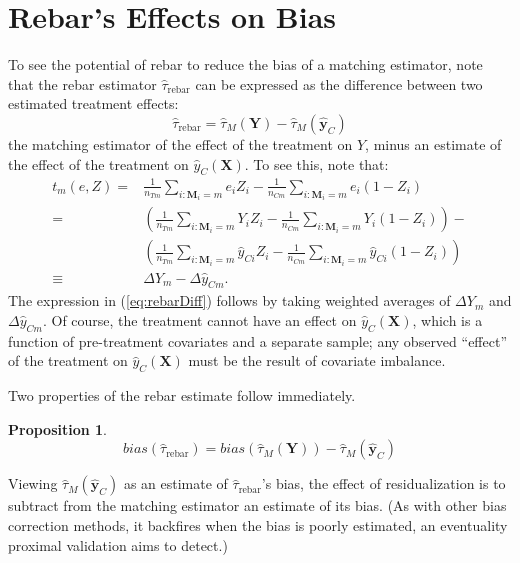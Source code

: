 \documentclass[12pt]{article}\usepackage[]{graphicx}\usepackage[]{color}
\newcommand{\est}{\hat{\tau}_{\text{rebar}}}
\newcommand{\Match}{M}
\newcommand{\match}{m}
\newcommand{\covMat}{\bm{X}}
\newtheorem{prop}{Proposition}
\begin{document}
\section{Rebar's Effects on Bias}\label{sec:bias}
To see the potential of rebar to reduce the bias of a matching estimator, note that
the rebar estimator $\est$ can be expressed as the difference between two estimated treatment effects:
\begin{equation}\label{eq:rebarDiff}
\est = \hat{\tau}_\Match (\bm{Y})-\hat{\tau}_\Match (\bm{\hat{y}}_C)
\end{equation}
the matching estimator of the effect of the treatment on $Y$, minus an estimate of the effect of the treatment on $\hat{y}_C(\covMat)$.
To see this, note that:
  \begin{align*}
t_m(e,Z)=&\frac{1}{n_{Tm}}\sum_{i:\bm{\Match}_i=\match} e_i Z_i
-\frac{1}{n_{Cm}}\sum_{i:\bm{\Match}_i=\match} e_i (1-Z_i)\\
=&\left(\frac{1}{n_{Tm}}\sum_{i:\bm{\Match}_i=\match} Y_i Z_i
         -\frac{1}{n_{Cm}}\sum_{i:\bm{\Match}_i=\match} Y_i (1-Z_i)\right)-\\
&\left(\frac{1}{n_{Tm}}\sum_{i:\bm{\Match}_i=\match} \hat{y}_{Ci} Z_i
        -\frac{1}{n_{Cm}}\sum_{i:\bm{\Match}_i=\match} \hat{y}_{Ci} (1-Z_i)\right)\\
\equiv& \Delta Y_m -\Delta \hat{y}_{Cm}.
\end{align*}
The expression in (\ref{eq:rebarDiff}) follows by taking weighted averages of $\Delta Y_m$ and $\Delta \hat{y}_{Cm}$.
Of course, the treatment cannot have an effect on $\hat{y}_C(\covMat)$, which is a function of pre-treatment covariates and a separate sample; any observed ``effect'' of the treatment on $\hat{y}_C(\covMat)$ must be the result of covariate imbalance.

Two properties of the rebar estimate follow immediately.
\begin{prop}\label{prop:biasSum}
\begin{equation*}
bias(\est)=bias(\hat{\tau}_\Match (\bm{Y}))- \hat{\tau}_\Match (\bm{\hat{y}}_C)
\end{equation*}
\end{prop}
Viewing $\hat{\tau}_\Match (\bm{\hat{y}}_C)$ as an
estimate of $\est$'s bias, the effect of
residualization is to subtract from the matching estimator an estimate
of its bias.  (As with other bias correction methods, it backfires when the bias is poorly
estimated, an eventuality proximal validation aims to detect.)
\end{document}

